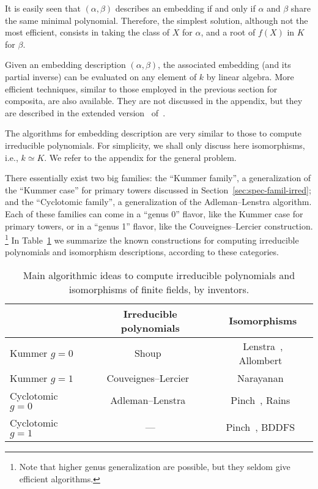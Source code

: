 \documentclass{report}
\theoremstyle{plain}
\theoremstyle{definition}
\begin{document}
It is easily seen that $(α,β)$ describes an embedding if and only if
$α$ and $β$ share the same minimal polynomial. %
Therefore, the simplest solution, although not the most efficient,
consists in taking the class of $X$ for $α$, and a root of $f(X)$ in
$K$ for $β$. %

Given an embedding description $(α,β)$, the associated embedding (and
its partial inverse) can be evaluated on any element of $k$ by linear
algebra. %
More efficient techniques, similar to those employed in the previous
section for composita, are also available. %
They are not discussed in the appendix, but they are described in the
extended version~\cite{ffisom-long} of~\cite{brieulle2018computing}. %

The algorithms for embedding description are very similar to those to
compute irreducible polynomials. %
For simplicity, we shall only discuss here isomorphisms, i.e.,
$k≃K$. %
We refer to the appendix for the general problem. %

There essentially exist two big families: the ``Kummer family'', a
generalization of the ``Kummer case'' for primary towers discussed in
Section~\ref{sec:spec-famil-irred}; and the ``Cyclotomic family'', a
generalization of the Adleman--Lenstra algorithm. %
Each of these families can come in a ``genus 0'' flavor, like the
Kummer case for primary towers, or in a ``genus 1'' flavor, like the
Couveignes--Lercier construction.%
\footnote{Note that higher genus generalization are possible, but they
  seldom give efficient algorithms.} %
In Table~\ref{tab:ffalgos} we summarize the known constructions for
computing irreducible polynomials and isomorphism descriptions,
according to these categories. %


\begin{table}
  \centering
  \begin{tabular}{l | c | c}
    & Irreducible polynomials
    & Isomorphisms\\
    \hline
    Kummer $g=0$
    & Shoup~\cite{Shoup_1990,shoup93,shoup94}
    & Lenstra~\cite{LenstraJr91},
      Allombert~\cite{Allombert02}\\
    Kummer $g=1$
    & Couveignes--Lercier~\cite{couveignes+lercier11}
    & Narayanan~\cite{narayanan2016fast}\\
    Cyclotomic $g=0$
    & Adleman--Lenstra~\cite{Adleman-Lenstra}
    & Pinch~\cite{Pinch}, Rains~\cite{rains2008}\\
    Cyclotomic $g=1$
    & ---
    & Pinch~\cite{Pinch}, BDDFS~\cite{brieulle2018computing}
  \end{tabular}
  \caption{Main algorithmic ideas to compute irreducible polynomials
    and isomorphisms of finite fields, by inventors.}
  \label{tab:ffalgos}
\end{table}
\end{document}
